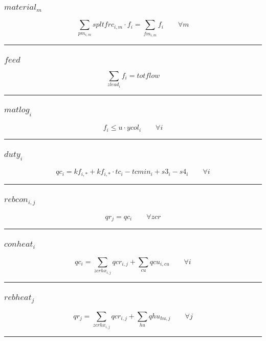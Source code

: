 \documentclass[11pt]{article}
\begin{document}
\subsubsection*{$material_{m}$}
\begin{equation*}
\sum_{pm_{i,m}} spltfrc_{i,m} \cdot f_{i} = \sum_{fm_{i,m}} f_{i}\qquad \forall m
\end{equation*}
\vspace{5pt}
\hrule
\subsubsection*{$feed$}
\begin{equation*}
\sum_{zlead_{i}} f_{i} = totflow
\end{equation*}
\vspace{5pt}
\hrule
\subsubsection*{$matlog_{i}$}
\begin{equation*}
f_{i} \leq u \cdot ycol_{i}\qquad \forall i
\end{equation*}
\vspace{5pt}
\hrule
\subsubsection*{$duty_{i}$}
\begin{equation*}
qc_{i} = kf_{i,*} + kf_{i,*} \cdot tc_{i} - tcmin_{i} + s3_{i} - s4_{i}\qquad \forall i
\end{equation*}
\vspace{5pt}
\hrule
\subsubsection*{$rebcon_{i,j}$}
\begin{equation*}
qr_{j} = qc_{i}\qquad \forall zcr
\end{equation*}
\vspace{5pt}
\hrule
\subsubsection*{$conheat_{i}$}
\begin{equation*}
qc_{i} = \sum_{zcrhx_{i,j}} qcr_{i,j} + \sum_{cu} qcu_{i,cu}\qquad \forall i
\end{equation*}
\vspace{5pt}
\hrule
\subsubsection*{$rebheat_{j}$}
\begin{equation*}
qr_{j} = \sum_{zcrhx_{i,j}} qcr_{i,j} + \sum_{hu} qhu_{hu,j}\qquad \forall j
\end{equation*}
\vspace{5pt}
\hrule
\end{document}
